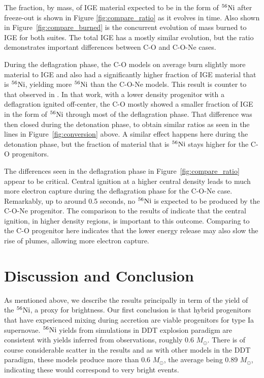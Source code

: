 \documentclass[iop,apj]{emulateapj}
\newcommand{\Ni}[1]{\ensuremath{{}^{#1}{\rm Ni}}}
\newcommand{\Msun}{\ensuremath{M_\odot}}
\begin{document}
The fraction, by mass, of IGE material expected to be in the form of \Ni{56} after freeze-out is shown in Figure \ref{fig:compare_ratio} as it evolves in time.
Also shown in Figure~\ref{fig:compare_burned} is the concurrent evolution of mass burned to IGE for both suites.
The total IGE has a mostly similar evolution, but the ratio demonstrates important differences between C-O and C-O-Ne cases.

During the deflagration phase, the C-O models
on average burn slightly more material to IGE and also had a significantly higher
fraction of IGE material that is \Ni{56}, yielding more \Ni{56} than
the C-O-Ne models. This result is counter to that observed in
\citet{willcoxetal2016}.
In that work, with a lower density progenitor with a deflagration ignited off-center, the C-O mostly showed a smaller fraction of IGE in the form of \Ni{56} through most of the deflagration phase.
That difference was then closed during the detonation phase, to obtain similar ratios as seen in the lines in Figure~\ref{fig:conversion} above.
A similar effect happens here during the detonation phase, but the fraction of material that is \Ni{56} stays higher for the C-O progenitors.

The differences seen in the deflagration phase in Figure~\ref{fig:compare_ratio} appear to be critical.
Central ignition at a higher central density leads to much more electron capture during the deflagration phase for the C-O-Ne case.
Remarkably, up to around 0.5 seconds, no \Ni{56} is expected to be produced by the C-O-Ne progenitor.
The comparison to the results of \citep{willcoxetal2016} indicate that the central ignition, in higher density regions, is important to this outcome.
Comparing to the C-O progenitor here indicates that the lower energy release may also slow the rise of plumes, allowing more electron capture.

\section{Discussion and Conclusion}



As mentioned above, we describe the results principally in term of the
yield of the \Ni{56}, a proxy for brightness.  Our first conclusion
is that hybrid progenitors that have experienced mixing during accretion are 
viable progenitors for type Ia supernovae. \Ni{56} yields from simulations
in DDT explosion paradigm are consistent with yields inferred from
observations, roughly 0.6 \Msun.  There is of course considerable scatter
in the results and as with other models in the DDT paradigm,
these models produce more than 0.6 \Msun, the average being 0.89 \Msun,
indicating these would correspond to very bright events.  
\end{document}
